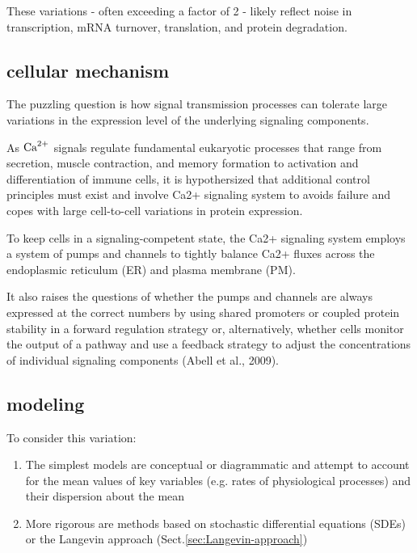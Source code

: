 These variations - often exceeding a factor of 2 - likely reflect noise in
transcription, mRNA turnover, translation, and protein degradation.

\subsection{cellular mechanism}

The puzzling question is how signal transmission processes can tolerate large
variations in the expression level of the underlying signaling components.

As ${\text{Ca}^{2+}}$ signals regulate fundamental eukaryotic processes that range from
secretion, muscle contraction, and memory formation to activation and
differentiation of immune cells, it is hypothersized that additional control
principles must exist and involve Ca2+ signaling system to avoids failure and
copes with large cell-to-cell variations in protein expression.

To keep cells in a signaling-competent state, the Ca2+ signaling system employs
a system of pumps and channels to tightly balance Ca2+ fluxes across the
endoplasmic reticulum (ER) and plasma membrane (PM).

It also raises the questions of whether the pumps and channels are always
expressed at the correct numbers by using shared promoters or coupled protein
stability in a forward regulation strategy or, alternatively, whether cells
monitor the output of a pathway and use a feedback strategy to adjust the
concentrations of individual signaling components (Abell et al., 2009).





\subsection{modeling}
To consider this variation:
\begin{enumerate}
  
  \item The simplest models are conceptual or diagrammatic and attempt to
  account for the mean values of key variables (e.g. rates of physiological
  processes) and their dispersion about the mean

  \item More rigorous are methods based on stochastic differential equations (SDEs) or the
Langevin approach (Sect.\ref{sec:Langevin-approach})

\end{enumerate}

